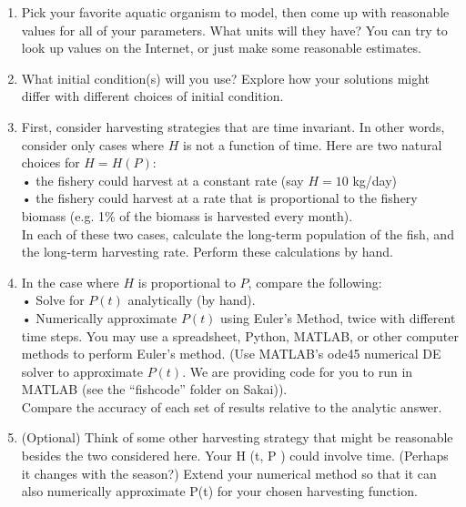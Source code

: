 \documentclass[11pt,letterpaper,boxed]{hmcpset}
\begin{document}
\begin{problem}[3]
\begin{enumerate}
\item Pick your favorite aquatic organism to model, then come up with reasonable values for all of your parameters. What units will they have? You can try to look up values on the Internet, or just make some reasonable estimates.
\item What initial condition(s) will you use? Explore how your solutions might differ with different choices of initial condition.
\item First, consider harvesting strategies that are time invariant. In other words, consider only cases where $H$ is not a function of time. Here are two natural choices for
$H = H(P)$:\\
• the fishery could harvest at a constant rate (say $H = 10$ kg/day)\\
• the fishery could harvest at a rate that is proportional to the fishery biomass (e.g. 1\% of the biomass is harvested every month).\\
In each of these two cases, calculate the long-term population of the fish, and the long-term harvesting rate. Perform these calculations by hand.
\item In the case where $H$ is proportional to $P$, compare the following:\\
• Solve for $P(t)$ analytically (by hand).\\
• Numerically approximate $P(t)$ using Euler’s Method, twice with different time steps. You may use a spreadsheet, Python, MATLAB, or other computer methods to perform Euler’s method. (Use MATLAB’s ode45 numerical DE solver to approximate $P(t)$. We are providing code for you to run in MATLAB (see the “fishcode” folder on Sakai)).\\
Compare the accuracy of each set of results relative to the analytic answer.
\item (Optional) Think of some other harvesting strategy that might be reasonable besides the two considered here. Your H (t, P ) could involve time. (Perhaps it changes with the season?) Extend your numerical method so that it can also numerically approximate P(t) for your chosen harvesting function.
\end{enumerate}
\end{problem}


\pagebreak
\hfill
\pagebreak
\end{document}
